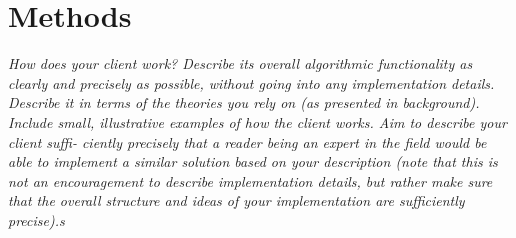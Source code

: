 \section{Methods}
\label{sec:methods}

\textit{How does your client work? Describe its overall algorithmic functionality as clearly and precisely as possible, without going into any implementation details. Describe it in terms of the theories you rely on (as presented in background). Include small, illustrative examples of how the client works. Aim to describe your client suffi- ciently precisely that a reader being an expert in the field would be able to implement a similar solution based on your description (note that this is not an encouragement to describe implementation details, but rather make sure that the overall structure and ideas of your implementation are sufficiently precise).s}


